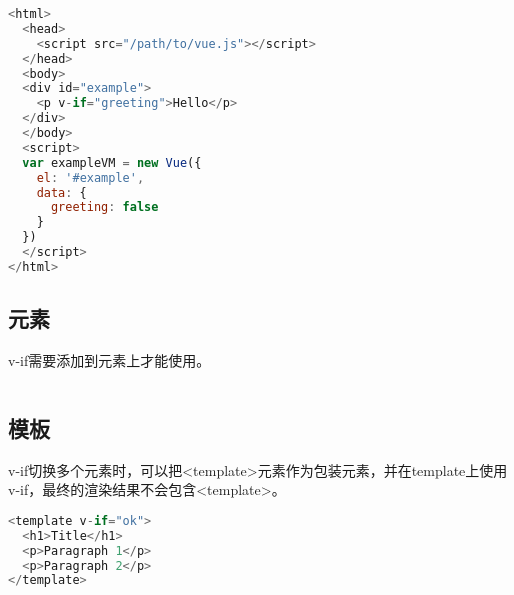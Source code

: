 \begin{lstlisting}[language=JavaScript]
<html>
  <head>
    <script src="/path/to/vue.js"></script>
  </head>
  <body>
  <div id="example">
    <p v-if="greeting">Hello</p>
  </div>
  </body>
  <script>
  var exampleVM = new Vue({
    el: '#example',
    data: {
      greeting: false
    }
  })
  </script>
</html>
\end{lstlisting}

\subsection{元素}

v-if需要添加到元素上才能使用。

\begin{lstlisting}[language=JavaScript]

\end{lstlisting}


\subsection{模板}

v-if切换多个元素时，可以把<template>元素作为包装元素，并在template上使用v-if，最终的渲染结果不会包含<template>。


\begin{lstlisting}[language=JavaScript]
<template v-if="ok">
  <h1>Title</h1>
  <p>Paragraph 1</p>
  <p>Paragraph 2</p>
</template>
\end{lstlisting}




\begin{lstlisting}[language=JavaScript]

\end{lstlisting}




\begin{lstlisting}[language=JavaScript]

\end{lstlisting}




\begin{lstlisting}[language=JavaScript]

\end{lstlisting}




\begin{lstlisting}[language=JavaScript]

\end{lstlisting}




